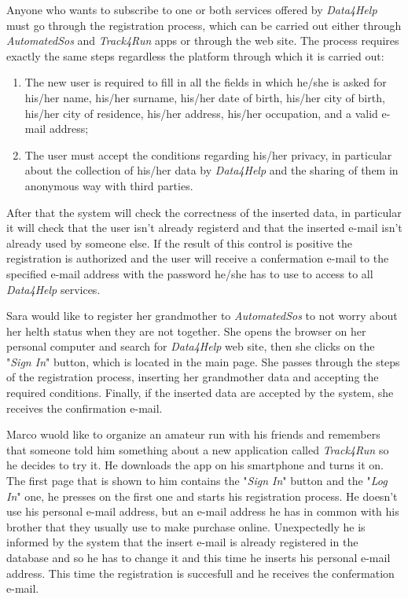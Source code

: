 Anyone who wants to subscribe to one or both services offered by \textit{Data4Help} must go through the registration process, which can be carried out either through \textit{AutomatedSos} and \textit{Track4Run} apps or through the web site.
The process requires exactly the same steps regardless the platform through which it is carried out:
\begin{enumerate}
  \item The new user is required to fill in all the fields in which he/she is asked for his/her name, his/her surname, his/her date of birth, his/her city of birth, his/her city of residence, his/her address, his/her occupation, and a valid e-mail address;
  \item The user must accept the conditions regarding his/her privacy, in particular about the collection of his/her data by \textit{Data4Help} and the sharing of them in anonymous way with third parties.
\end{enumerate}
After that the system will check the correctness of the inserted data, in particular it will check that the user isn't already registerd and that the inserted e-mail isn't already used by someone else. If the result of this control is positive the registration is authorized and the user will receive a confermation e-mail to the specified e-mail address with the password he/she has to use to access to all \textit{Data4Help} services.

 \label{aSOSsignin}
Sara would like to register her grandmother to \textit{AutomatedSos} to not worry about her helth status when they are not together. She opens the browser on her personal computer and search for \textit{Data4Help} web site, then she clicks on the "\textit{Sign In}" button, which is located in the main page. She passes through the steps of the registration process, inserting her grandmother data and accepting the required conditions. Finally, if the inserted data are accepted by the system, she receives the confirmation e-mail.

Marco wuold like to organize an amateur run with his friends and remembers that someone told him something about a new application called \textit{Track4Run} so he decides to try it. He downloads the app on his smartphone and turns it on. The first page that is shown to him contains the "\textit{Sign In}" button and the "\textit{Log In}" one, he presses on the first one and starts his registration process. He doesn't use his personal e-mail address, but an e-mail address he has in common with his brother that they usually use to make purchase online. Unexpectedly he is informed by the system that the insert e-mail is already registered in the database and so he has to change it and this time he inserts his personal e-mail address. This time the registration is succesfull and he receives the confermation e-mail.

